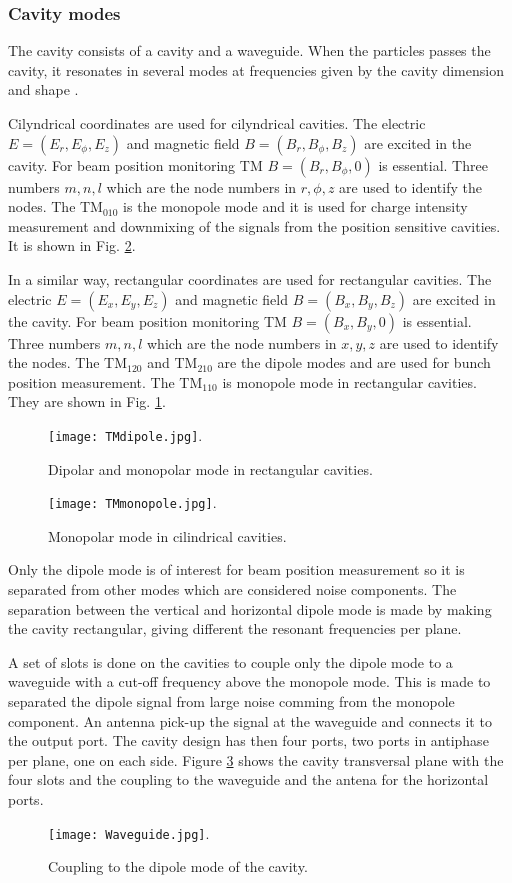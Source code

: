 \subsubsection{Cavity modes}
The cavity consists of a cavity and a waveguide. When the particles passes the cavity, it resonates in several modes at frequencies given by the cavity dimension and shape \cite{PhysRevSTAB.15.042801}.\par 
Cilyndrical coordinates are used for cilyndrical cavities. The electric $E=(E_r,E_\phi,E_z)$ and magnetic field $B=(B_r,B_\phi,B_z)$ are excited in the cavity. For beam position monitoring TM $B=(B_r,B_\phi,0)$ is essential. Three numbers $m,n,l$ which are the node numbers in $r,\phi,z$ are used to identify the nodes. The TM$_{010}$ is the monopole mode and it is used for charge intensity measurement and downmixing of the signals from the position sensitive cavities. It is shown in Fig. \ref{f:monopole}.\par
In a similar way, rectangular coordinates are used for rectangular cavities. The electric $E=(E_x,E_y,E_z)$ and magnetic field $B=(B_x,B_y,B_z)$ are excited in the cavity. For beam position monitoring TM $B=(B_x,B_y,0)$ is essential. Three numbers $m,n,l$ which are the node numbers in $x,y,z$ are used to identify the nodes. The TM$_{120}$ and TM$_{210}$ are the dipole modes and are used for bunch position measurement. The TM$_{110}$ is monopole mode in rectangular cavities. They are shown in Fig. \ref{f:dipole}.\par
\begin{figure}[htb]
\centering
\texttt{[image: TMdipole.jpg]}.\caption{Dipolar and monopolar mode in rectangular cavities.}\label{f:dipole}
\end{figure}
\begin{figure}[htb]
\centering
\texttt{[image: TMmonopole.jpg]}.\caption{Monopolar mode in cilindrical cavities.}\label{f:monopole}
\end{figure}
Only the dipole mode is of interest for beam position measurement so it is separated from other modes which are considered noise components. The separation between the vertical and horizontal dipole mode is made by making the cavity rectangular, giving different the resonant frequencies per plane.\par
A set of slots is done on the cavities to couple only the dipole mode to a waveguide with a cut-off frequency above the monopole mode. This is made to separated the dipole signal from large noise comming from the monopole component. An antenna pick-up the signal at the waveguide and connects it to the output port. The cavity design has then four ports, two ports in antiphase per plane, one on each side. Figure \ref{f:waveguide} shows the cavity transversal plane with the four slots and the coupling to the waveguide and the antena for the horizontal ports.\par
\begin{figure}[htb]
\centering
\texttt{[image: Waveguide.jpg]}.\caption{Coupling to the dipole mode of the cavity.}\label{f:waveguide}
\end{figure}
